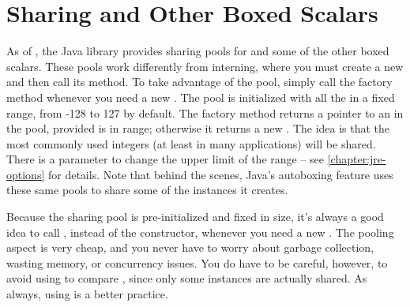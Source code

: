 \section{Sharing  and Other Boxed Scalars}

As of \javafive, the Java library provides sharing pools for
 and some of the other boxed scalars. These pools
work differently from  interning, where you must create a
new  and then call its  method. To take
advantage of the  pool, simply call the factory method
 whenever you need a new .
The  pool is initialized with all the  in a fixed
range, from -128 to 127 by default. The factory method returns a
pointer to an  in the pool, provided  is in
range; otherwise it returns a new . 
The idea is  that the most commonly
used integers (at least in many applications) will be shared. There is a
parameter to change the upper limit of the range -- see
\autoref{chapter:jre-options} for details. Note that
behind the scenes, Java's autoboxing feature uses these same pools
to share some of the instances it creates.



Because the  sharing pool is pre-initialized and fixed in size,
it's always a good idea to call , instead of
the constructor, whenever you need a new . The pooling aspect is
very cheap, and you never have to worry about garbage collection, wasting memory, or concurrency issues.
You do have to be careful, however, to avoid using \code{==} to compare
, since only some instances are actually shared. 
As always, using  is a better practice.

